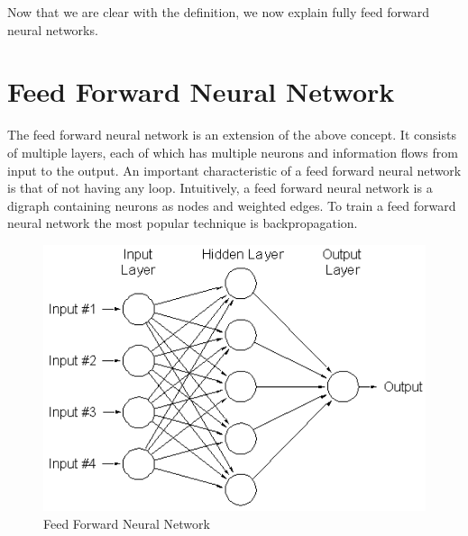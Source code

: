 \par
Now that we are clear with the definition, we now explain fully feed forward neural networks.
\section{Feed Forward Neural Network}
The feed forward neural network is an extension of the above concept. It consists of multiple layers, each of which has multiple neurons and information flows from input to the output. An important characteristic of a feed forward neural network is that of not having any loop. Intuitively, a feed forward neural network is a digraph containing neurons as nodes and weighted edges. To train a feed forward neural network the most popular technique is backpropagation.
\begin{figure}[H]
  \centering
    \includegraphics[scale=.6, angle=0]{Files/FFNN.png}
    \caption[Feed Forward Neural Network]{Feed Forward Neural Network}
    \label{fig:FFNN}
\end{figure}

